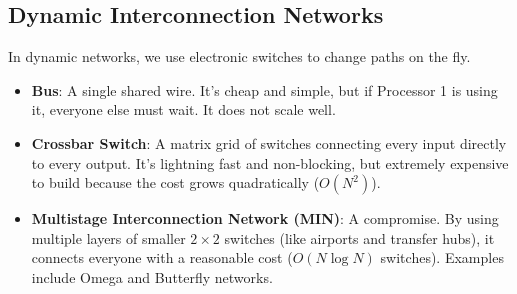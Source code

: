 \documentclass[11pt,a4paper]{article}
\begin{document}
\subsection{Dynamic Interconnection Networks}
In dynamic networks, we use electronic switches to change paths on the fly.
\begin{itemize}
    \item \textbf{Bus}: A single shared wire. It's cheap and simple, but if Processor 1 is using it, everyone else must wait. It does not scale well.
    \item \textbf{Crossbar Switch}: A matrix grid of switches connecting every input directly to every output. It's lightning fast and non-blocking, but extremely expensive to build because the cost grows quadratically ($O(N^2)$).
    \item \textbf{Multistage Interconnection Network (MIN)}: A compromise. By using multiple layers of smaller $2 \times 2$ switches (like airports and transfer hubs), it connects everyone with a reasonable cost ($O(N \log N)$ switches). Examples include Omega and Butterfly networks.
\end{itemize}
\end{document}
